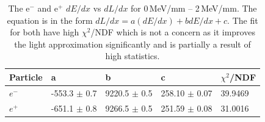 \begin{table}[!h]
\centering
\begin{tabular}{lllll}  
\toprule
Particle       & a                 & b                 & c                 & $\chi^2$/NDF\\
\midrule
$e^-$          & -553.3 $\pm$ 0.7  & 9220.5 $\pm$ 0.5  & 258.10 $\pm$ 0.07 & 39.9469 \\
$e^+$          & -651.1 $\pm$ 0.8  & 9266.5 $\pm$ 0.5  & 251.59 $\pm$ 0.08 & 31.0016 \\
\bottomrule  
\end{tabular}
\caption{The e$^-$ and e$^+$ $dE/dx$ vs $dL/dx$ for 0\,MeV/mm -- 2\,MeV/mm. The equation is in the form $dL/dx = a (dE/dx) + b dE/dx + c$. The fit for both have high $\chi^2$/NDF which is not a concern as it improves the light approximation significantly and is partially a result of high statistics. }
\label{tab:e-e+SquareDlDeTable}
\end{table}

